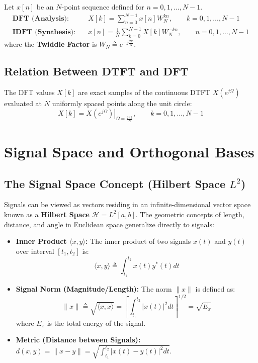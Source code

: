 \documentclass[12pt,a4paper]{article}
\begin{document}
\begin{tcolorbox}[defbox, title={\textbf{Definition: Discrete Fourier Transform (DFT) Pair}}]
Let $x[n]$ be an $N$-point sequence defined for $n = 0, 1, \dots, N-1$.
\begin{align}
  \textbf{DFT (Analysis):} \quad &X[k] = \sum_{n=0}^{N-1} x[n] W_N^{kn}, \qquad k = 0, 1, \dots, N-1 \\
  \textbf{IDFT (Synthesis):} \quad &x[n] = \frac{1}{N} \sum_{k=0}^{N-1} X[k] W_N^{-kn}, \qquad n = 0, 1, \dots, N-1
\end{align}
where the \textbf{Twiddle Factor} is $W_N \triangleq e^{-j\frac{2\pi}{N}}$.
\end{tcolorbox}

\subsection{Relation Between DTFT and DFT}
The DFT values $X[k]$ are exact samples of the continuous DTFT $X(e^{j\Omega})$ evaluated at $N$ uniformly spaced points along the unit circle:
\begin{equation}
  X[k] = \left. X(e^{j\Omega}) \right|_{\Omega = \frac{2\pi k}{N}}, \qquad k = 0, 1, \dots, N-1
\end{equation}

\section{Signal Space and Orthogonal Bases}

\subsection{The Signal Space Concept (Hilbert Space $L^2$)}
Signals can be viewed as vectors residing in an infinite-dimensional vector space known as a \textbf{Hilbert Space} $\mathcal{H} = L^2[a,b]$. The geometric concepts of length, distance, and angle in Euclidean space generalize directly to signals:

\begin{itemize}[topsep=2pt, itemsep=2pt]
  \item \textbf{Inner Product $\langle x, y \rangle$:} The inner product of two signals $x(t)$ and $y(t)$ over interval $[t_1, t_2]$ is:
  \begin{equation}
    \langle x, y \rangle \triangleq \int_{t_1}^{t_2} x(t) y^*(t) dt
  \end{equation}
  \item \textbf{Signal Norm (Magnitude/Length):} The norm $\|x\|$ is defined as:
  \begin{equation}
    \|x\| \triangleq \sqrt{\langle x, x \rangle} = \left[ \int_{t_1}^{t_2} |x(t)|^2 dt \right]^{1/2} = \sqrt{E_x}
  \end{equation}
  where $E_x$ is the total energy of the signal.
  \item \textbf{Metric (Distance between Signals):} $d(x, y) = \|x - y\| = \sqrt{\int_{t_1}^{t_2} |x(t) - y(t)|^2 dt}$.
\end{itemize}
\end{document}

